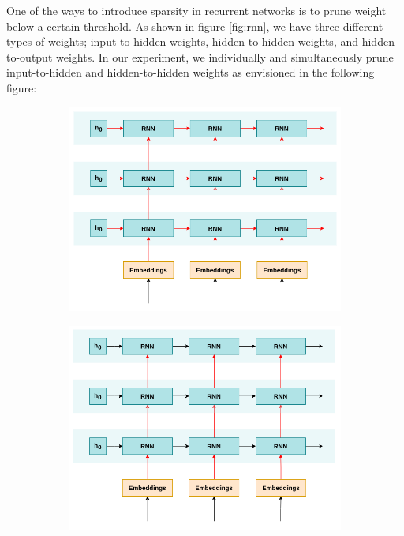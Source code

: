 One of the ways to introduce sparsity in recurrent networks is to prune weight below a certain threshold. As shown in figure \ref{fig:rnn}, we have three different types of weights; input-to-hidden weights, hidden-to-hidden weights, and hidden-to-output weights. In our experiment, we individually and simultaneously prune input-to-hidden and hidden-to-hidden weights as envisioned in the following figure:

\begin{figure}[h]
  \begin{subfigure}{0.33\textwidth}
    \includegraphics[width=\linewidth]{images/experiments/both_prune.png}
    \caption{} \label{fig:both}
  \end{subfigure}%
  \begin{subfigure}{0.33\textwidth}
    \includegraphics[width=\linewidth]{images/experiments/i2h_prune.png}

\end{subfigure}
\end{figure}
